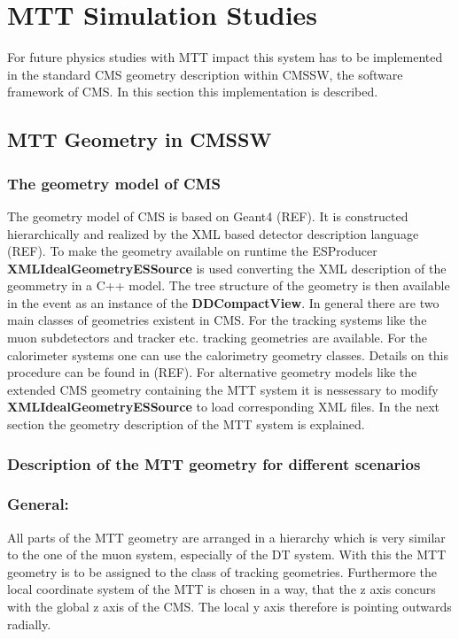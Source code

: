 \section{MTT Simulation Studies}
	For future physics studies with MTT impact this system has to be implemented in the standard CMS geometry description within CMSSW, the software framework of CMS.
	In this section this implementation is described.
	\subsection{MTT Geometry in CMSSW}
		\subsubsection{The geometry model of CMS}
			The geometry model of CMS is based on Geant4 (REF).
			It is constructed hierarchically and realized by the XML based detector description language (REF).
			To make the geometry available on runtime the ESProducer \textbf{XMLIdealGeometryESSource} is used converting the XML description of the geommetry in a C++ model.
			The tree structure of the geometry is then available in the event as an instance of the \textbf{DDCompactView}.
			In general there are two main classes of geometries existent in CMS.
			For the tracking systems like the muon subdetectors and tracker etc. tracking geometries are available.
			For the calorimeter systems one can use the calorimetry geometry classes.
			Details on this procedure can be found in (REF).
			For alternative geometry models like the extended CMS geometry containing the MTT system it is nessessary to modify \textbf{XMLIdealGeometryESSource} to load corresponding XML files.
			In the next section the geometry description of the MTT system is explained.
		\subsubsection{Description of the MTT geometry for different scenarios}
			\subsubsection*{General:}
			All parts of the MTT geometry are arranged in a hierarchy which is very similar to the one of the muon system, especially of the DT system.
			With this the MTT geometry is to be assigned to the class of tracking geometries.
			Furthermore the local coordinate system of the MTT is chosen in a way, that the z axis concurs with the global z axis of the CMS.
			The local y axis therefore is pointing outwards radially.
